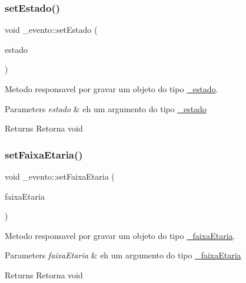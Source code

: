 \subsubsection{\texorpdfstring{setEstado()}{setEstado()}}
{\footnotesize\ttfamily void \+\_\+evento\+::set\+Estado (\begin{DoxyParamCaption}\item[{const \mbox{\hyperlink{class__estado}{\+\_\+estado}} \&}]{estado }\end{DoxyParamCaption})}



Metodo responsavel por gravar um objeto do tipo \mbox{\hyperlink{class__estado}{\+\_\+estado}}. 


\begin{DoxyParams}{Parameters}
{\em estado} & eh um argumento do tipo \mbox{\hyperlink{class__estado}{\+\_\+estado}} \\
\hline
\end{DoxyParams}
\begin{DoxyReturn}{Returns}
Retorna void 
\end{DoxyReturn}
\mbox{\label{class__evento_a708adeef6900a5fea7700d23c86890d8}} 
\subsubsection{\texorpdfstring{setFaixaEtaria()}{setFaixaEtaria()}}
{\footnotesize\ttfamily void \+\_\+evento\+::set\+Faixa\+Etaria (\begin{DoxyParamCaption}\item[{const \mbox{\hyperlink{class__faixa_etaria}{\+\_\+faixa\+Etaria}} \&}]{faixa\+Etaria }\end{DoxyParamCaption})}



Metodo responsavel por gravar um objeto do tipo \mbox{\hyperlink{class__faixa_etaria}{\+\_\+faixa\+Etaria}}. 


\begin{DoxyParams}{Parameters}
{\em faixa\+Etaria} & eh um argumento do tipo \mbox{\hyperlink{class__faixa_etaria}{\+\_\+faixa\+Etaria}} \\
\hline
\end{DoxyParams}
\begin{DoxyReturn}{Returns}
Retorna void 
\end{DoxyReturn}
\mbox{\label{class__evento_a400868de18046d2191ac43de35be2488}} 
